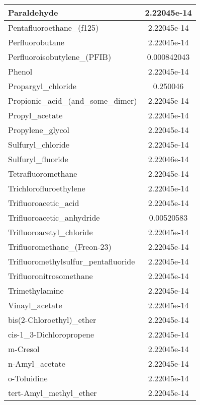 \begin{longtable}{|l|c|}
Paraldehyde 	& 2.22045e-14\\ \hline
Pentafluoroethane\_(f125) 	& 2.22045e-14\\ \hline
Perfluorobutane 	& 2.22045e-14\\ \hline
Perfluoroisobutylene\_(PFIB) 	& 0.000842043\\ \hline
Phenol 	& 2.22045e-14\\ \hline
Propargyl\_chloride 	& 0.250046\\ \hline
Propionic\_acid\_(and\_some\_dimer) 	& 2.22045e-14\\ \hline
Propyl\_acetate 	& 2.22045e-14\\ \hline
Propylene\_glycol 	& 2.22045e-14\\ \hline
Sulfuryl\_chloride 	& 2.22045e-14\\ \hline
Sulfuryl\_fluoride 	& 2.22046e-14\\ \hline
Tetrafluoromethane 	& 2.22045e-14\\ \hline
Trichlorofluroethylene 	& 2.22045e-14\\ \hline
Trifluoroacetic\_acid 	& 2.22045e-14\\ \hline
Trifluoroacetic\_anhydride 	& 0.00520583\\ \hline
Trifluoroacetyl\_chloride 	& 2.22045e-14\\ \hline
Trifluoromethane\_(Freon-23) 	& 2.22045e-14\\ \hline
Trifluoromethylsulfur\_pentafluoride 	& 2.22045e-14\\ \hline
Trifluoronitrosomethane 	& 2.22045e-14\\ \hline
Trimethylamine 	& 2.22045e-14\\ \hline
Vinayl\_acetate 	& 2.22045e-14\\ \hline
bis(2-Chloroethyl)\_ether 	& 2.22045e-14\\ \hline
cis-1\_3-Dichloropropene 	& 2.22045e-14\\ \hline
m-Cresol 	& 2.22045e-14\\ \hline
n-Amyl\_acetate 	& 2.22045e-14\\ \hline
o-Toluidine 	& 2.22045e-14\\ \hline
tert-Amyl\_methyl\_ether 	& 2.22045e-14\\ \hline
\bottomrule
\end{longtable}
